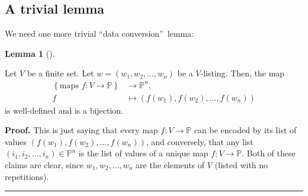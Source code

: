 \documentclass[numbers=enddot,12pt,final,onecolumn,notitlepage]{scrartcl}%
\numberwithin{exer}{section}
\theoremstyle{definition}
\newtheorem{lem}[theo]{Lemma}
\newenvironment{lemma}[1][]
{\begin{lem}[#1]\begin{leftbar}}
{\end{leftbar}\end{lem}}
\newenvironment{proof}[1][Proof]{\noindent\textbf{#1.} }{\ \rule{0.5em}{0.5em}}
\newenvironment{vershort}{}{}
\begin{document}
\subsection{A trivial lemma}

We need one more trivial \textquotedblleft data conversion\textquotedblright\ lemma:

\begin{lemma}
\label{lem.maps-vs-tups}Let $V$ be a finite set. Let $w=\left(  w_{1}%
,w_{2},\ldots,w_{n}\right)  $ be a $V$-listing. Then, the map%
\begin{align*}
\left\{  \text{maps }f:V\rightarrow\mathbb{P}\right\}   &  \rightarrow
\mathbb{P}^{n},\\
f  &  \mapsto\left(  f\left(  w_{1}\right)  ,f\left(  w_{2}\right)
,\ldots,f\left(  w_{n}\right)  \right)
\end{align*}
is well-defined and is a bijection.
\end{lemma}

\begin{vershort}


\begin{proof}
This is just saying that every map $f:V\rightarrow\mathbb{P}$ can be encoded
by its list of values $\left(  f\left(  w_{1}\right)  ,f\left(  w_{2}\right)
,\ldots,f\left(  w_{n}\right)  \right)  $, and conversely, that any list
$\left(  i_{1},i_{2},\ldots,i_{n}\right)  \in\mathbb{P}^{n}$ is the list of
values of a unique map $f:V\rightarrow\mathbb{P}$. Both of these claims are
clear, since $w_{1},w_{2},\ldots,w_{n}$ are the elements of $V$ (listed with
no repetitions).
\end{proof}
\end{vershort}
\end{document}
